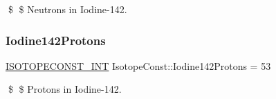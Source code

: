 \$ \$ Neutrons in Iodine-\/142. \mbox{\label{group___isotope_const-_iodine-_i142_ga5d5eb7fff010d4996de26fa1f331dbf7}} 
\subsubsection{\texorpdfstring{Iodine142\+Protons}{Iodine142Protons}}
{\footnotesize\ttfamily \mbox{\hyperlink{group___isotope_const-_macros_ga5f18360b3e99483a35c32d789e62621c}{I\+S\+O\+T\+O\+P\+E\+C\+O\+N\+S\+T\+\_\+\+I\+NT}} Isotope\+Const\+::\+Iodine142\+Protons = 53}

\$ \$ Protons in Iodine-\/142. 